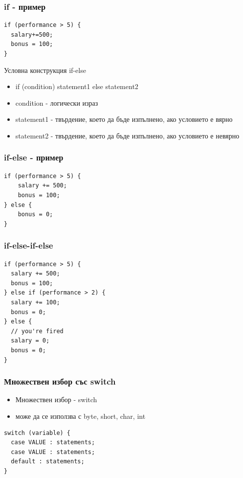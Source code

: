 \documentclass{beamer}
\begin{document}
\begin{frame}[fragile]
  \frametitle{if - пример}
  \transdissolve
\begin{lstlisting}
if (performance > 5) {
  salary+=500;
  bonus = 100;
}
\end{lstlisting}
\end{frame}

\begin{frame}{Условна конструкция if-else}
  \transdissolve
  \begin{itemize}
  \item if (condition) statement1 else statement2
  \item condition - логически израз
  \item statement1 - твърдение, което да бъде
      изпълнено, ако условието е вярно
  \item statement2 - твърдение, което да бъде
    изпълнено, ако условието е невярно
  \end{itemize}
\end{frame}

\begin{frame}[fragile]
  \frametitle{if-else - пример}
  \transdissolve
\begin{lstlisting}
if (performance > 5) {
    salary += 500;
    bonus = 100;
} else {
    bonus = 0;
}
\end{lstlisting}
\end{frame}

\begin{frame}[fragile]
  \frametitle{if-else-if-else}
  \transdissolve
\begin{lstlisting}
if (performance > 5) {
  salary += 500;
  bonus = 100;
} else if (performance > 2) {
  salary += 100;
  bonus = 0;
} else { 
  // you're fired
  salary = 0; 
  bonus = 0; 
}
\end{lstlisting}
\end{frame}

\begin{frame}[fragile]
  \frametitle{Множествен избор със switch}
  \transdissolve
  \begin{itemize}
  \item Множествен избор - switch
  \item може да се
    използва с byte, short, char, int
  \end{itemize}
  \begin{lstlisting}
switch (variable) {
  case VALUE : statements;
  case VALUE : statements;
  default : statements;
}
  \end{lstlisting}
\end{frame}
\end{document}
